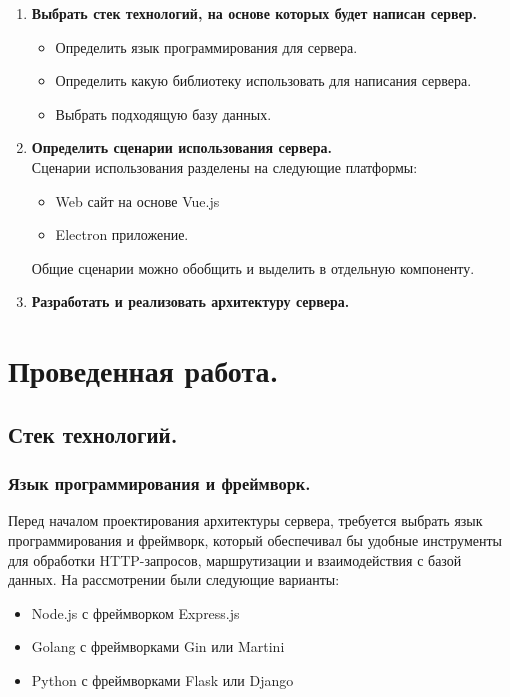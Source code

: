 \documentclass[12pt, russian]{extarticle}
\begin{document}
\begin{spacing}{1.5}
    \begin{enumerate}
        \item \textbf{Выбрать стек технологий, на основе которых будет написан сервер.}
            \begin{itemize}
                \item Определить язык программирования для сервера.
                \item Определить какую библиотеку использовать для написания сервера.
                \item Выбрать подходящую базу данных.
            \end{itemize}
        \item \textbf{Определить сценарии использования сервера.} \\
            Сценарии использования разделены на следующие платформы:
            \begin{itemize}
                \item Web сайт на основе Vue.js
                \item Electron приложение.
            \end{itemize}
            Общие сценарии можно обобщить и выделить в отдельную компоненту.
        \item \textbf{Разработать и реализовать архитектуру сервера.}
    \end{enumerate}

    \newpage
    \section{Проведенная работа.}

    \subsection{Стек технологий.}

    \subsubsection{Язык программирования и фреймворк.}

    Перед началом проектирования архитектуры сервера, требуется выбрать язык программирования
    и фреймворк, который обеспечивал бы удобные инструменты для обработки HTTP-запросов,
    маршрутизации и взаимодействия с базой данных. На рассмотрении были следующие варианты:

    \begin{itemize}
        \item Node.js с фреймворком Express.js
        \item Golang с фреймворками Gin или Martini
        \item Python с фреймворками Flask или Django
    \end{itemize}


\end{spacing}
\end{document}
